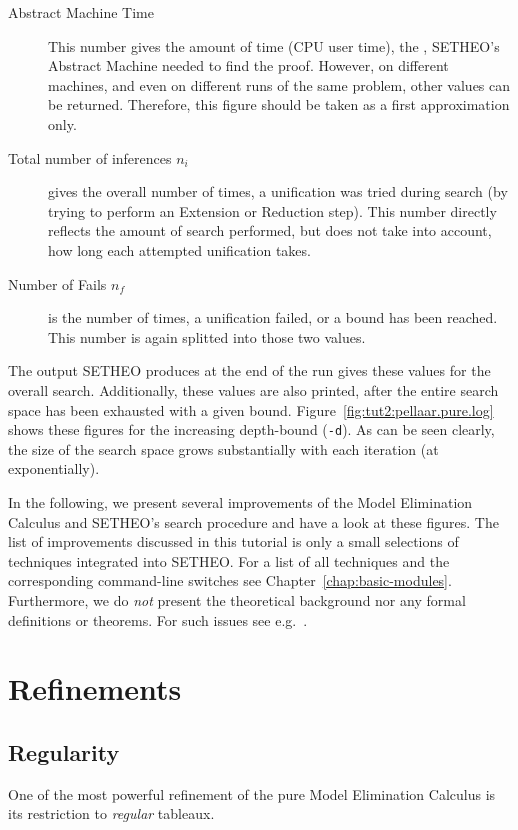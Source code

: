 \begin{description}
\item[Abstract Machine Time] This number gives the amount of time (CPU user 
time),
the \SAM, SETHEO's Abstract Machine needed to find the proof. 
However, on different machines, and even on different runs of the same
problem, other values can be returned. Therefore, this figure should be
taken as a first approximation only.
\item[Total number of inferences $n_i$] gives the overall number of times,
a unification was tried during search (by trying to perform an
Extension or Reduction step). This number directly reflects the amount
of search performed, but does not take into account, how long each
attempted unification takes.

\item[Number of Fails $n_f$] is the number of times, a unification failed,
or a bound has been reached. This number is again splitted into those
two values.
\end{description}

The output SETHEO produces at the end of the run gives these values
for the overall search. Additionally, these values are also
printed, after the entire search space has been exhausted with a given
bound. Figure~\ref{fig:tut2:pellaar.pure.log} shows these figures
for the increasing depth-bound ({\tt -d}). As can be seen clearly,
the size of the search space grows substantially with each iteration
(at exponentially).

In the following, we present several improvements of the Model
Elimination Calculus and SETHEO's search procedure and have a look
at these figures.
The list of improvements discussed in this tutorial
is only a small selections of techniques integrated into SETHEO.
For a list of all techniques and the corresponding command-line
switches see Chapter~\ref{chap:basic-modules}.
Furthermore, we do {\em not\/} present the theoretical background
nor any formal definitions or theorems. For such issues see
e.g.\ \cite{LSBB89,LMG94,Letzdiss,Mayrdiss}.

\section{Refinements}
\subsection{Regularity}

One of the most powerful refinement of the pure Model Elimination
Calculus is its restriction to {\em regular\/} tableaux.


